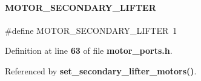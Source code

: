 \paragraph{M\+O\+T\+O\+R\+\_\+\+S\+E\+C\+O\+N\+D\+A\+R\+Y\+\_\+\+L\+I\+F\+T\+ER}
{\footnotesize\ttfamily \#define M\+O\+T\+O\+R\+\_\+\+S\+E\+C\+O\+N\+D\+A\+R\+Y\+\_\+\+L\+I\+F\+T\+ER~1}



Definition at line \textbf{ 63} of file \textbf{ motor\+\_\+ports.\+h}.



Referenced by \textbf{ set\+\_\+secondary\+\_\+lifter\+\_\+motors()}.

